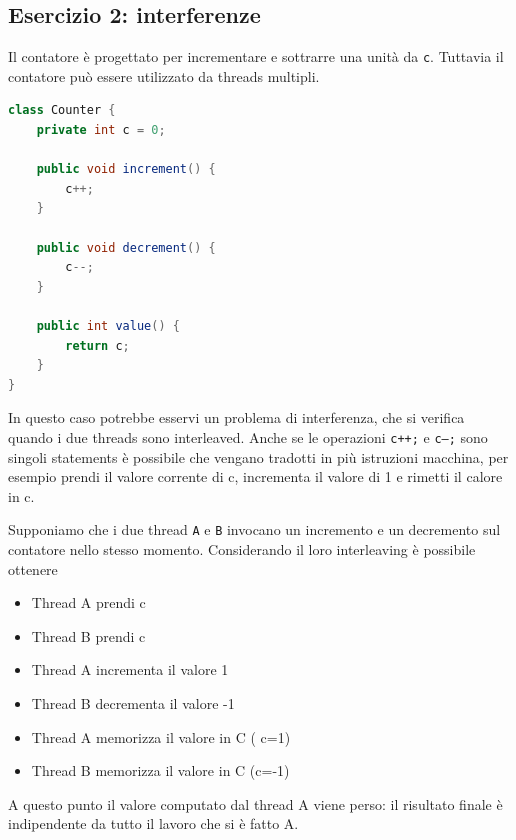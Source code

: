 \documentclass{article}
\begin{document}
\subsection{Esercizio 2: interferenze}
Il contatore \`e progettato per incrementare e sottrarre una unit\`a da \texttt{c}. Tuttavia il contatore pu\`o essere utilizzato da threads multipli. 
\begin{lstlisting}[language=Java]
class Counter {
    private int c = 0;

    public void increment() {
        c++;
    }

    public void decrement() {
        c--;
    }

    public int value() {
        return c;
    }
}
\end{lstlisting}
In questo caso potrebbe esservi un problema di interferenza, che si verifica quando i due threads sono interleaved. Anche se le operazioni \texttt{c++;} e \texttt{c--;} sono singoli statements \`e possibile che vengano tradotti in pi\`u istruzioni macchina, per esempio prendi il valore corrente di c, incrementa il valore di 1 e rimetti il calore in c.

Supponiamo che i due thread \texttt{A} e \texttt{B} invocano un incremento e un decremento sul contatore nello stesso momento. Considerando il loro interleaving \`e possibile ottenere
\begin{itemize}
\item Thread A prendi c
\item Thread B prendi c
\item Thread A incrementa il valore 1
\item Thread B decrementa il valore -1
\item Thread A memorizza il valore in C ( c=1)
\item Thread B memorizza il valore in C (c=-1)
\end{itemize}
A questo punto il valore computato dal thread A viene perso: il risultato finale \`e indipendente da tutto il lavoro che si \`e fatto A. 
\end{document}

